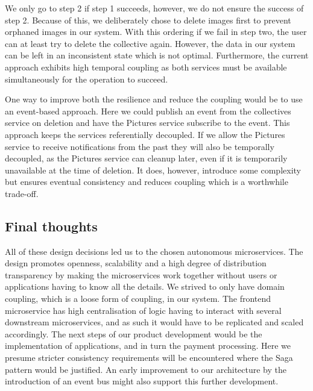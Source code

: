 We only go to step 2 if step 1 succeeds, however, we do not
ensure the success of step 2.
Because of this, we deliberately chose to delete images first to prevent orphaned images
in our system.
With this ordering if we fail in step two, the user can at least try to delete the collective again.
However, the data in our system can be left in an inconsistent state which is not optimal.
Furthermore, the current approach exhibits high temporal coupling as both services must be available simultaneously for the operation to succeed.

One way to improve both the resilience and reduce the coupling would be to use an event-based approach.
Here we could publish an event from the collectives service on deletion and have the Pictures service subscribe to the event. 
This approach keeps the services referentially decoupled. If we allow the Pictures service to receive notifications from the past they will also be temporally decoupled, 
as the Pictures service can cleanup later, even if it is temporarily unavailable at the time of deletion.
It does, however, introduce some complexity but ensures eventual consistency and reduces coupling which is a worthwhile trade-off.



\subsection{Final thoughts}
All of these design decisions led us to the chosen autonomous microservices. The design promotes openness, scalability and a high degree of distribution transparency 
by making the microservices work together without users or applications having to know all the details.
We strived to only have domain coupling, which is a loose form of coupling, in our system. 
The frontend microservice has high centralisation of logic
having to interact with several downstream microservices, and as such it would have to be replicated and scaled accordingly.
The next steps of our product development would be the implementation of applications, and in turn
the payment processing. Here we presume stricter consistency requirements will be encountered where the Saga pattern would be justified. 
An early improvement to our architecture by the introduction of an event bus might also support this further development.